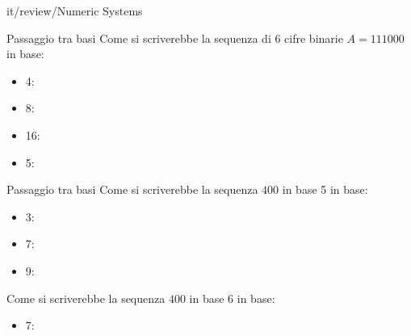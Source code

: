 \documentclass[11pt]{article}
\begin{document}
\begin{quiz}{it/review/Numeric Systems}

\begin{cloze}[points=1,shuffle=false]{Passaggio tra basi}
Come si scriverebbe la sequenza di 6 cifre binarie $A = 111000$ in base:
\begin{itemize}
\item 4: 
\item 8: 
\item 16: 
\item 5: 
\end{itemize}
\end{cloze}

\begin{cloze}[points=1,shuffle=false]{Passaggio tra basi}
Come si scriverebbe la sequenza $400$ in base 5 in base:
\begin{itemize}
\item 3: 
\item 7: 
\item 9: 
\end{itemize}

Come si scriverebbe la sequenza $400$ in base 6 in base:
\begin{itemize}
\item 7: 
\end{itemize}
\end{cloze}


\end{quiz}
\end{document}
